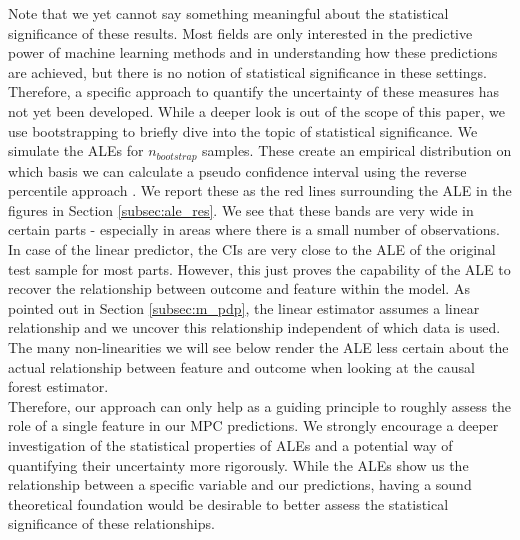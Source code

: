 Note that we yet cannot say something meaningful about the statistical significance of these results. Most fields are only interested in the predictive power of machine learning methods and in understanding how these predictions are achieved, but there is no notion of statistical significance in these settings. Therefore, a specific approach to quantify the uncertainty of these measures has not yet been developed. While a deeper look is out of the scope of this paper, we use bootstrapping to briefly dive into the topic of statistical significance. We simulate the ALEs for $n_{bootstrap}$ samples. These create an empirical distribution on which basis we can calculate a pseudo confidence interval using the reverse percentile approach \citep{davisonhenley_1997}. We report these as the red lines surrounding the ALE in the figures in Section \ref{subsec:ale_res}. We see that these bands are very wide in certain parts - especially in areas where there is a small number of observations. In case of the linear predictor, the CIs are very close to the ALE of the original test sample for most parts. However, this just proves the capability of the ALE to recover the relationship between outcome and feature within the model. As pointed out in Section \ref{subsec:m_pdp}, the linear estimator assumes a linear relationship and we uncover this relationship independent of which data is used. The many non-linearities we will see below render the ALE less certain about the actual relationship between feature and outcome when looking at the causal forest estimator. \\
Therefore, our approach can only help as a guiding principle to roughly assess the role of a single feature in our MPC predictions. We strongly encourage a deeper investigation of the statistical properties of ALEs and a potential way of quantifying their uncertainty more rigorously. While the ALEs show us the relationship between a specific variable and our predictions, having a sound theoretical foundation would be desirable to better assess the statistical significance of these relationships. 


